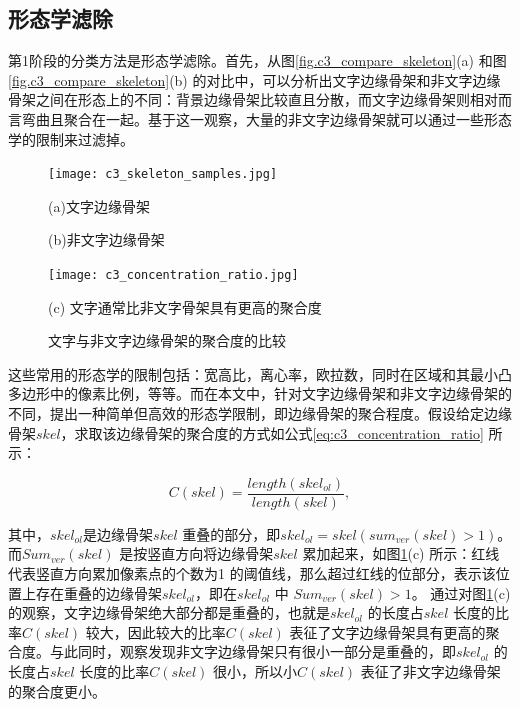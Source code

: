         \subsection{形态学滤除}

        第1阶段的分类方法是形态学滤除。首先，从图\ref{fig.c3_compare_skeleton}(a) 和图\ref{fig.c3_compare_skeleton}(b) 的对比中，可以分析出文字边缘骨架和非文字边缘骨架之间在形态上的不同：背景边缘骨架比较直且分散，而文字边缘骨架则相对而言弯曲且聚合在一起。基于这一观察，大量的非文字边缘骨架就可以通过一些形态学的限制来过滤掉。

        \begin{figure}[!h]
        \centering
        \texttt{[image: c3\_skeleton\_samples.jpg]}
        \begin{minipage}[t]{0.48\linewidth}
        \centerline{\small (a)文字边缘骨架}
        \end{minipage}
        \begin{minipage}[t]{0.48\linewidth}
        \centerline{\small (b)非文字边缘骨架}
        \end{minipage}
        \texttt{[image: c3\_concentration\_ratio.jpg]}
        \centerline{\small (c) 文字通常比非文字骨架具有更高的聚合度}
        \caption{文字与非文字边缘骨架的聚合度的比较} \label{fig.c3_concentration_ratio}
        \end{figure}

        这些常用的形态学的限制包括：宽高比，离心率，欧拉数，同时在区域和其最小凸多边形中的像素比例，等等。而在本文中，针对文字边缘骨架和非文字边缘骨架的不同，提出一种简单但高效的形态学限制，即边缘骨架的聚合程度。假设给定边缘骨架$skel$，求取该边缘骨架的聚合度的方式如公式\ref{eq:c3_concentration_ratio} 所示：

        \begin{equation}
        C(skel)=\frac{length(skel_{ol})}{length(skel)},
        \label{eq:c3_concentration_ratio}
        \end{equation}

        其中，$skel_{ol}$是边缘骨架$skel$ 重叠的部分，即$skel_{ol}=skel(sum_{ver}(skel)>1)$。 而$Sum_{ver}(skel)$ 是按竖直方向将边缘骨架$skel$ 累加起来，如图\ref{fig.c3_concentration_ratio}(c) 所示：红线代表竖直方向累加像素点的个数为1 的阈值线，那么超过红线的位部分，表示该位置上存在重叠的边缘骨架$skel_{ol}$，即在$skel_{ol}$ 中 $Sum_{ver}(skel)>1$。 通过对图\ref{fig.c3_concentration_ratio}(c) 的观察，文字边缘骨架绝大部分都是重叠的，也就是$skel_{ol}$ 的长度占$skel$ 长度的比率$C(skel)$ 较大，因此较大的比率$C(skel)$ 表征了文字边缘骨架具有更高的聚合度。与此同时，观察发现非文字边缘骨架只有很小一部分是重叠的，即$skel_{ol}$ 的长度占$skel$ 长度的比率$C(skel)$ 很小，所以小$C(skel)$ 表征了非文字边缘骨架的聚合度更小。

